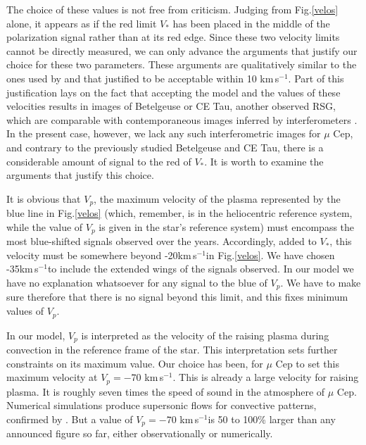 \documentclass{/Users/art2/TeX/aanda/aa}
\def\kms {km\,s$^{-1}$}
\begin{document}
 The choice of these values is not free from criticism. Judging from Fig.\ref{velos} alone, it appears as if the red limit $V_*$ has been placed in the middle of the polarization signal rather than at its red edge.  Since these two velocity limits cannot be directly measured, we can only advance the arguments that justify our choice for these two parameters.   These arguments are qualitatively similar to the ones used by \cite{LA18} and that \cite{LA22}
 justified to be acceptable within 10 \kms. Part of this justification lays on the fact that accepting the model and the values of these velocities results in images of Betelgeuse or CE Tau, another observed RSG, which are comparable with contemporaneous images inferred by interferometers \citep{LA18}.  In the present case, however, we lack any such interferometric images for $\mu$ Cep, and  contrary to the previously studied Betelgeuse and CE Tau, there is a considerable amount of signal to the red of $V_*$. It is worth to examine the arguments that justify this choice.

 It is obvious that $V_p$, the maximum velocity of the plasma represented by the blue line  in Fig.\ref{velos} (which, remember, is in the heliocentric reference system, while the value of $V_p$ is given in the star's reference system) must encompass the most blue-shifted signals observed over the years. Accordingly, added to $V_*$, this velocity must be somewhere beyond -20\kms in Fig.\ref{velos}.  We have chosen -35\kms to include the extended wings of the signals observed.  In our model we have no explanation whatsoever for any signal to the blue of $V_p$. We have to make sure therefore that there is no signal beyond this limit, and this fixes minimum values of $V_p$.

In our model, $V_p$ is interpreted as the velocity of the raising plasma during convection in the reference frame of the star. This interpretation sets further constraints on its maximum value. Our choice has been, for $\mu$ Cep to set this maximum velocity at $V_p=-70$ \kms. This is already a large velocity for raising plasma. It is roughly seven times the speed of sound in the atmosphere of $\mu$ Cep. Numerical simulations \citep{freytag_spots_2002, chiavassa_radiative_2011} produce supersonic flows  for convective patterns, confirmed by \cite{LA18}. But  a value of  $V_p=-70$ \kms is 
50 to 100\% larger than any announced figure so far, either observationally or numerically.
\end{document}
